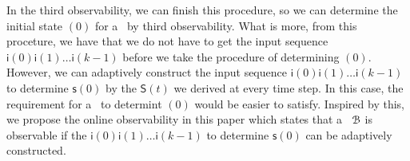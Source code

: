In the third observability, we can finish this procedure, so we can determine the initial state \State$(0)$ for a \BCN\ by third observability. What is more, from this proceture, we have that we do not have to get the input sequence $\mathsf{i}(0)\mathsf{i}(1)\ldots\mathsf{i}(k-1)$ before we take the procedure of determining \State$(0)$. However, we can adaptively construct the input sequence $\mathsf{i}(0)\mathsf{i}(1)\ldots\mathsf{i}(k-1)$ to determine $\mathsf{s}(0)$ by the $\mathsf{S}(t)$ we derived at every time step. In this case, the requirement for a \BCN\ to determint \State$(0)$ would be easier to satisfy. Inspired by this, we propose the online observability in this paper which states that a \BCN\ ${\mathcal{B}}$ is observable if the $\mathsf{i}(0)\mathsf{i}(1)\ldots\mathsf{i}(k-1)$ to determine $\mathsf{s}(0)$ can be adaptively constructed. %


